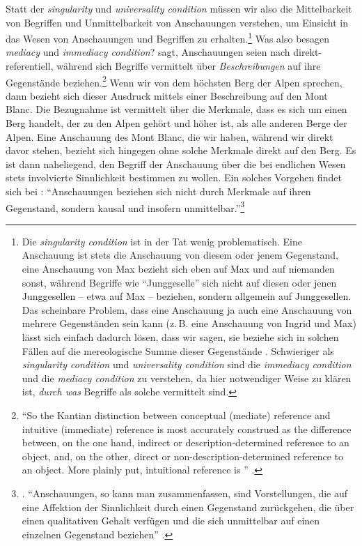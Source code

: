 Statt der \emph{singularity} und \emph{universality
condition} müssen wir also die Mittelbarkeit von Begriffen und Unmittelbarkeit
von Anschauungen verstehen, um Einsicht in das Wesen von Anschauungen und
Begriffen zu erhalten.\footnote{Die \emph{singularity condition} ist in der Tat
wenig problematisch. Eine Anschauung ist stets die Anschauung von diesem oder jenem
Gegenstand, eine Anschauung von Max bezieht sich eben auf Max und auf niemanden
sonst, während Begriffe wie \enquote{Junggeselle} sich nicht auf diesen oder
jenen Junggesellen -- etwa auf Max -- beziehen, sondern allgemein auf
Junggesellen. Das scheinbare Problem, dass eine Anschauung ja auch eine
Anschauung von mehrere Gegenständen sein kann (z.\,B. eine Anschauung von Ingrid und Max) lässt sich
einfach dadurch lösen, dass wir sagen, sie beziehe sich in solchen Fällen auf
die mereologische Summe dieser Gegenstände
\parencite[vgl.][47]{Gruene:BlindeAnschauung2009}. Schwieriger als
\emph{singularity condition} und \emph{universality condition} sind die
\emph{immediacy condition} und die \emph{mediacy condition} zu verstehen, da
hier notwendiger Weise zu klären ist, \emph{durch was} Begriffe als solche
vermittelt sind.}
Was also besagen \emph{mediacy} und \emph{immediacy condition}?
 sagt,
Anschauungen seien nach  di\-rekt-re\-feren\-tiell, während
sich Begriffe vermittelt über \emph{Beschreibungen} auf ihre Gegenstände
beziehen.\footnote{\enquote{So the Kantian distinction between conceptual
(mediate) reference and intuitive (immediate) reference is most accurately
construed as the difference between, on the one hand, indirect or
description-determined reference to an object, and, on the other, direct or
non-description-determined reference to an object. More plainly put, intuitional
reference is }
\parencite[][197]{Hanna:KantandtheFoundationsofAnalyticPhilosophy2001}.}
Wenn wir von dem höchsten Berg der Alpen sprechen, dann
bezieht sich dieser Ausdruck mittels einer Beschreibung auf den Mont Blanc. Die
Bezugnahme ist vermittelt über die Merkmale, dass es sich um einen Berg handelt,
der zu den Alpen gehört und höher ist, als alle anderen Berge der Alpen. Eine
Anschauung des Mont Blanc, die wir haben, während wir direkt davor stehen,
bezieht sich hingegen ohne solche Merkmale direkt auf den Berg. Es ist dann
naheliegend, den Begriff der Anschauung über die bei endlichen Wesen stets involvierte
Sinnlichkeit bestimmen zu wollen. Ein solches Vorgehen findet sich bei
:
\enquote{Anschauungen beziehen sich nicht durch Merkmale auf ihren Gegenstand,
sondern kausal und insofern
unmittelbar.}\footnote{\cite[][548]{Willaschek:DertranszendentaleIdealismusunddieIdealitaetvonRaumundZeit1997}.
\enquote{Anschauungen, so kann man zusammenfassen, sind Vorstellungen, die auf eine
Affektion der Sinnlichkeit durch einen Gegenstand zurückgehen, die über einen
qualitativen Gehalt verfügen und die sich unmittelbar auf einen einzelnen
Gegenstand beziehen}
\parencite[][\pno~545\,f.]{Willaschek:DertranszendentaleIdealismusunddieIdealitaetvonRaumundZeit1997}.}

